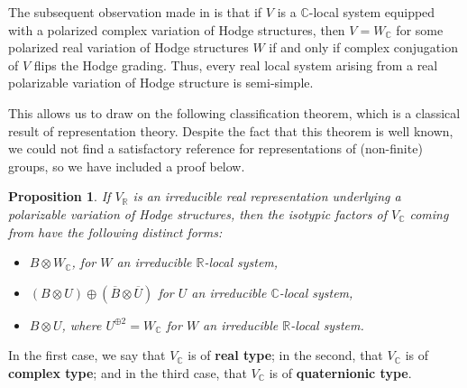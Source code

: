 \documentclass[12pt]{amsart}
\newcommand{\R}{\mathbb{R}}
\newcommand{\C}{\mathbb{C}}
\newtheorem{proposition}[theorem]{Proposition}
\theoremstyle{definition}
\theoremstyle{remark}
\numberwithin{equation}{section}
\begin{document}
The subsequent observation made in \cite{bak22} is that if $V$ is a $\C$-local system 
equipped with a polarized complex variation of Hodge structures, then
$V =  W_\C$ for some polarized real variation of Hodge structures $W$ 
if and only if complex conjugation of $V$ flips the Hodge grading. Thus, every
real local system arising from a real polarizable variation of Hodge structure is
semi-simple.

This allows us to draw on the following classification theorem, which is a classical
result of representation theory. Despite the fact that this theorem is well known,
we could not find a satisfactory reference for representations of (non-finite) groups,
so we have included a proof below.
\begin{proposition} \label{rep-classification}
    If $V_\R$ is an irreducible real representation underlying a polarizable 
    variation of Hodge structures, then the isotypic factors of 
    $V_\C$ coming from  have the following
    distinct forms:
    \begin{itemize}
    \item[\textbf{(R)}]  $B \otimes W_\C$, for $W$ an irreducible 
    $\R$-local system,
    \item[\textbf{(C)}] 
    $(B \otimes U) \oplus (\overline{B} \otimes \overline{U})$ for
    $U$ an irreducible $\C$-local system,
    \item[\textbf{(Q)}]  $B \otimes U$, where $U^{\oplus 2} = W_\C$
    for $W$ an irreducible $\R$-local system.
\end{itemize}
\end{proposition}

In the first case, we say that \(V_\C\) is of \textbf{real type}; in the second, 
that \(V_\C\) is of \textbf{complex type}; and in the third case, that \(V_\C\) is of 
\textbf{quaternionic type}.
\end{document}
